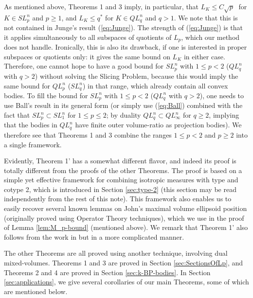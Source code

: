 \documentclass[12pt,oneside]{amsart}
\theoremstyle{definition}
\theoremstyle{remark}
\theoremstyle{proof}
\numberwithin{equation}{section}
\begin{document}
As mentioned above, Theorems 1 and 3 imply, in particular, that
$L_K \leq C \sqrt{p}\;$ for $K \in SL_p^n$ and $p \geq 1$, and
$L_K \leq q^*$ for $K \in QL_q^n$ and $q > 1$. We note that this
is not contained in Junge's result (\ref{eq:Junge}). The strength
of (\ref{eq:Junge}) is that it applies simultaneously to all
subspaces of quotients of $L_p$, which our method does not
handle. Ironically, this is also its drawback, if one is
interested in proper subspaces or quotients only: it gives the
same bound on $L_K$ in either case. Therefore, one cannot hope to
have a good bound for $SL_p^n$ with $1 \leq p < 2$ ($QL_q^n$ with
$q>2$) without solving the Slicing Problem, because this would
imply the same bound for $QL_p^n$ ($SL_q^n$) in that range, which
already contain all convex bodies. To fill the bound for $SL_p^n$
with $1 \leq p < 2$ ($QL_q^n$ with $q>2$), one needs to use Ball's
result in its general form (or simply use (\ref{eq:Ball})
combined with the fact that $SL_p^n \subset SL_1^n$ for $1 \leq p
\leq 2$; by duality $QL_q^n \subset QL_\infty^n$ for $q \geq 2$,
implying that the bodies in $QL_q^n$ have finite outer
volume-ratio as projection bodies). We therefore see that Theorems
1 and 3 combine the ranges $1 \leq p < 2$ and $p\geq 2$ into a
single framework.

\smallskip

Evidently, Theorem 1' has a somewhat different flavor, and indeed
its proof is totally different from the proofs of the other
Theorems. The proof is based on a simple yet effective framework
for combining isotropic measures with type and cotype 2, which is
introduced in Section \ref{sec:type-2} (this section may be read
independently from the rest of this note). This framework also
enables us to easily recover several known lemmas on John's
maximal volume ellipsoid position (originally proved using
Operator Theory techniques), which we use in the proof of Lemma
\ref{lem:M_p-bound} (mentioned above). We remark that Theorem 1'
also follows from the work in \cite{BMMP} but in a more
complicated manner.

\smallskip

The other Theorems are all proved using another technique,
involving dual mixed-volumes.
Theorems 1 and 3 are proved in Section \ref{sec:SectionsOfLp}, and
Theorems 2 and 4 are proved in Section \ref{sec:k-BP-bodies}. In
Section \ref{sec:applications}, we give several corollaries of
our main Theorems, some of which are mentioned below.
\end{document}
